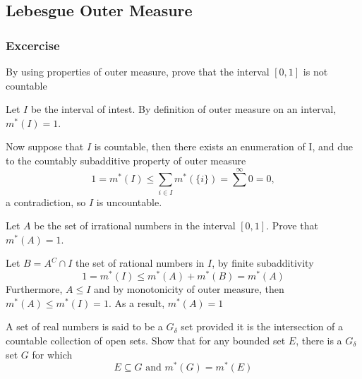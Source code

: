 \subsection{Lebesgue Outer Measure}

\subsubsection{Excercise}

\begin{exercise}{5}
    By using properties of outer measure, prove that the interval $[0, 1]$ is not countable
\end{exercise}

\begin{solution}
    Let $I$ be the interval of intest. By definition of outer measure on an interval, $m^*(I)=1$.

    Now suppose that $I$ is countable, then there exists an enumeration of I, and due to the countably subadditive property of outer measure
    \begin{equation*}
        1=m^*(I) \leq \sum_{i \in I} m^* (\{i\}) = \sum^\infty 0 = 0,
    \end{equation*}
    a contradiction, so $I$ is uncountable.
\end{solution}

\begin{exercise}{6}
    Let $A$ be the set of irrational numbers in the interval $[0,1]$. Prove that $m^*(A)=1$.
\end{exercise}
\begin{solution}
    Let $B = A^C \cap I$ the set of rational numbers in $I$, by finite subadditivity
    \begin{equation*}
        1=m^*(I) \leq m^*(A) + m^*(B) = m^*(A)
    \end{equation*}
    Furthermore, $A\leq I$ and by monotonicity of outer measure, then $m^*(A) \leq m^*(I)=1$. As a result, $m^*(A)=1$ 
\end{solution}

\begin{exercise}{7}
    A set of real numbers is said to be a $G_\delta$ set provided it is the intersection of a countable
    collection of open sets. Show that for any bounded set $E$, there is a $G_\delta$ set $G$ for which 
    \begin{equation*}
        E \subseteq G \text{ and } m^*(G) = m^*(E)
    \end{equation*}
\end{exercise}

